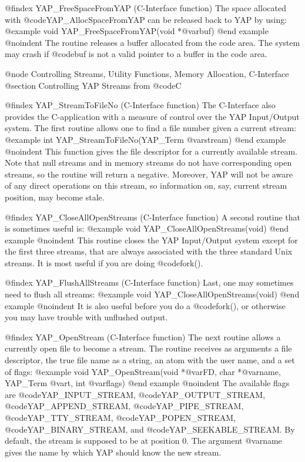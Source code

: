 {{{{{{{{{@findex YAP_FreeSpaceFromYAP (C-Interface function)
The space allocated with @code{YAP_AllocSpaceFromYAP} can be released
back to YAP by using:
@example
      void      YAP_FreeSpaceFromYAP(void *@var{buf})
@end example
@noindent
The routine releases a buffer allocated from the code area. The system
may crash if @code{buf} is not a valid pointer to a buffer in the code
area.

@node Controlling Streams, Utility Functions, Memory Allocation, C-Interface
@section Controlling YAP Streams from @code{C}

@findex YAP_StreamToFileNo (C-Interface function)
The C-Interface also provides the C-application with a measure of
control over the YAP Input/Output system. The first routine allows one
to find a file number given a current stream:
@example
      int      YAP_StreamToFileNo(YAP_Term @var{stream})
@end example
@noindent
This function gives the file descriptor for a currently available
stream. Note that null streams and in memory streams do not have
corresponding open streams, so the routine will return a
negative. Moreover, YAP will not be aware of any direct operations on
this stream, so information on, say, current stream position, may become
stale.

@findex YAP_CloseAllOpenStreams (C-Interface function)
A second routine that is sometimes useful is:
@example
      void      YAP_CloseAllOpenStreams(void)
@end example
@noindent
This routine closes the YAP Input/Output system except for the first
three streams, that are always associated with the three standard Unix
streams. It is most useful if you are doing @code{fork()}.

@findex YAP_FlushAllStreams (C-Interface function)
Last, one may sometimes need to flush all streams:
@example
      void      YAP_CloseAllOpenStreams(void)
@end example
@noindent
It is also useful before you do a @code{fork()}, or otherwise you may
have trouble with unflushed output.

@findex YAP_OpenStream (C-Interface function)
The next routine allows a currently open file to become a stream. The
routine receives as arguments a file descriptor, the true file name as a
string, an atom with the user name, and a set of flags:
@example
      void      YAP_OpenStream(void *@var{FD}, char *@var{name}, YAP_Term @var{t}, int @var{flags})
@end example
@noindent
The available flags are @code{YAP_INPUT_STREAM},
@code{YAP_OUTPUT_STREAM}, @code{YAP_APPEND_STREAM},
@code{YAP_PIPE_STREAM}, @code{YAP_TTY_STREAM}, @code{YAP_POPEN_STREAM},
@code{YAP_BINARY_STREAM}, and @code{YAP_SEEKABLE_STREAM}. By default, the
stream is supposed to be at position 0. The argument @var{name} gives
the name by which YAP should know the new stream.

}}}}}}}}}
